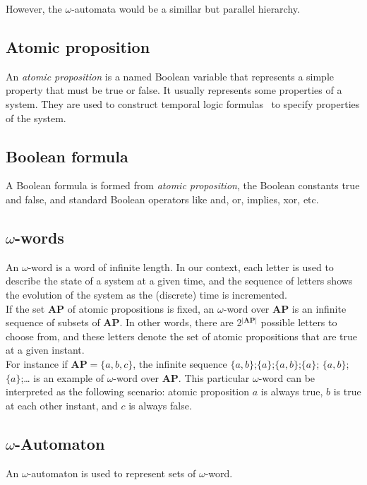 \noindent However, the $\omega$-automata would be a simillar but parallel hierarchy.

\subsection{Atomic proposition}
An \textit{atomic proposition} is a named Boolean variable that represents a simple property that must be
true or false. It usually represents some properties of a system. They are used to construct temporal logic
formulas~\cite{13} to specify properties of the system.

\subsection{Boolean formula}
A Boolean formula is formed from \textit{atomic proposition}, the Boolean constants true and false, and
standard Boolean operators like and, or, implies, xor, etc.

\subsection{$\omega$-words}
An $\omega$-word is a word of infinite length. In our context, each letter is used to
describe the state of a system at a given time, and the sequence of letters shows the evolution of the
system as the (discrete) time is incremented.\\

If the set \textbf{AP} of atomic propositions is fixed, an $\omega$-word over \textbf{AP} is an infinite
sequence of subsets of \textbf{AP}. In other words, there are 2$^{|\textbf{AP}|}$ possible letters to
choose from, and these letters denote the set of atomic propositions that are true at a given instant.\\

For instance if \textbf{AP}$=\{a,b,c\}$, the infinite sequence $\{a,b\}$;$\{a\}$;$\{a,b\}$;$\{a\}$;
$\{a,b\}$;$\{a\}$;… is an example of $\omega$-word over \textbf{AP}. This particular $\omega$-word can be
interpreted as the following scenario: atomic proposition $a$ is always true, $b$ is true at each other
instant, and $c$ is always false.

\subsection{$\omega$-Automaton}
An $\omega$-automaton is used to represent sets of $\omega$-word.\\

